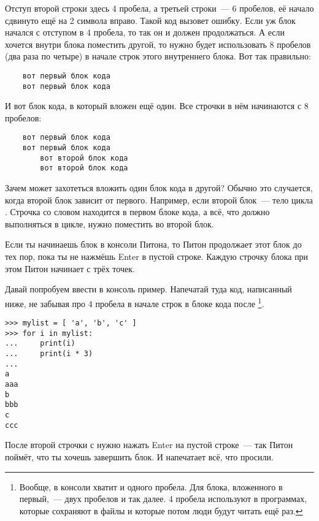 Отступ второй строки здесь 4 пробела, а третьей строки — 6 пробелов, её начало сдвинуто ещё на 2 символа вправо. Такой код вызовет ошибку. Если уж блок начался с отступом в 4 пробела, то так он и должен продолжаться. А если хочется внутри блока поместить другой, то нужно будет использовать 8 пробелов (два раза по четыре) в начале строк этого внутреннего блока. Вот так правильно:

\begin{listing}
\begin{verbatim}
    вот первый блок кода
    вот первый блок кода
\end{verbatim}
\end{listing}

И вот блок кода, в который вложен ещё один. Все строчки в нём начинаются с 8 пробелов:

\begin{listing}
\begin{verbatim}
    вот первый блок кода
    вот первый блок кода
        вот второй блок кода
        вот второй блок кода
\end{verbatim}
\end{listing}

Зачем может захотеться вложить один блок кода в другой? Обычно это случается, когда второй блок зависит от первого. Например, если второй блок — тело цикла . Строчка со словом  находится в первом блоке кода, а всё, что должно выполняться в цикле, нужно поместить во второй блок.

Если ты начинаешь блок в консоли Питона, то Питон продолжает этот блок до тех пор, пока ты не нажмёшь
Enter в пустой строке. Каждую строчку блока при этом Питон начинает с трёх точек.

Давай попробуем ввести в консоль пример. Напечатай туда код, написанный ниже, не забывая про 4 пробела в начале строк в блоке кода после \footnote{Вообще, в консоли хватит и одного пробела. Для блока, вложенного в первый, — двух пробелов и так далее. 4 пробела используют в программах, которые сохраняют в файлы и которые потом люди будут читать ещё раз.}.

\begin{listing}
\begin{verbatim}
>>> mylist = [ 'a', 'b', 'c' ]
>>> for i in mylist:
...     print(i)
...     print(i * 3)
...
a
aaa
b
bbb
c
ccc
\end{verbatim}
\end{listing}

После второй строчки с  нужно нажать Enter на пустой строке — так Питон поймёт, что ты хочешь завершить блок. И напечатает всё, что просили.

